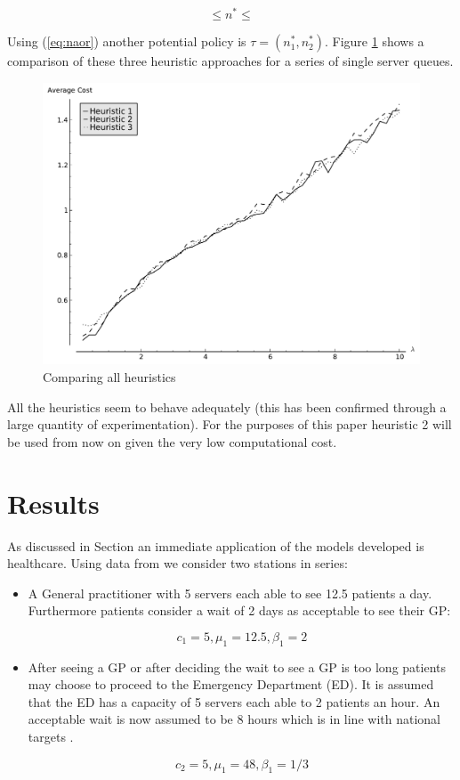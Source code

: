 \documentclass[12pt]{article}
\begin{document}
\begin{equation}\label{eq:naor}
  \leq  n ^ * \leq
\end{equation}

Using (\ref{eq:naor}) another potential policy is $\tau = (n^*_1, n^*_2)$.
Figure \ref{allheuristics} shows a comparison of these three heuristic approaches for a series of single server queues.

\begin{figure}[!hbtp]
    \begin{center}
        \includegraphics[width=.6\textwidth]{Images/Exit0.pdf}
    \end{center}
    \caption{Comparing all heuristics}\label{allheuristics}
\end{figure}

All the heuristics seem to behave adequately (this has been confirmed through a large quantity of experimentation).
For the purposes of this paper heuristic 2 will be used from now on given the very low computational cost.

\section{Results}\label{results}

As discussed in Section \label{introduction} an immediate application of the models developed is healthcare.
Using data from \cite{} we consider two stations in series:

\begin{itemize}
    \item A General practitioner with 5 servers each able to see 12.5 patients a day. Furthermore patients consider a wait of 2 days as acceptable to see their GP:

        $$c_1=5, \mu_1=12.5, \beta_1=2$$

    \item After seeing a GP or after deciding the wait to see a GP is too long \cite{FINDSOMEPOPNEWSABOUTTHIS} patients may choose to proceed to the Emergency Department (ED). It is assumed that the ED has a capacity of 5 servers each able to 2 patients an hour. An acceptable wait is now assumed to be 8 hours which is in line with national targets \cite{}.

        $$c_2=5, \mu_1=48, \beta_1=1/3$$
\end{itemize}
\end{document}
